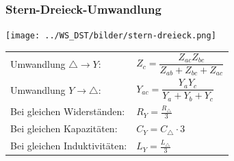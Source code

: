 % 	
	
		\subsubsection{Stern-Dreieck-Umwandlung}%
		  \begin{minipage}[lt]{7.5 cm}
		    \texttt{[image: ../WS\_DST/bilder/stern-dreieck.png]}
		  \end{minipage}
		  \begin{minipage}[rt]{9.35 cm} %
	      \renewcommand{\arraystretch}{2}
		  \begin{tabular}{ll}
			Umwandlung $\triangle \rightarrow Y$:
				&$Z_{c} = \dfrac{Z_{ac} Z_{bc}}{Z_{ab}+Z_{bc}+Z_{ac}}$\\
			Umwandlung $Y \rightarrow \triangle$:
				&$Y_{ac}=\dfrac{Y_{a} Y_{c}}{Y_{a}+Y_{b}+Y_{c}}$\\
			Bei gleichen Widerständen:
			&$R_Y = \frac{R_\triangle}{3}$ \\
			Bei gleichen Kapazitäten:
			&$C_Y = C_\triangle \cdot 3 $ \\
			Bei gleichen Induktivitäten:
			&$L_Y = \frac{L_\triangle}{3}$
			  \end{tabular}
		      \renewcommand{\arraystretch}{1}
			  \end{minipage}
	
